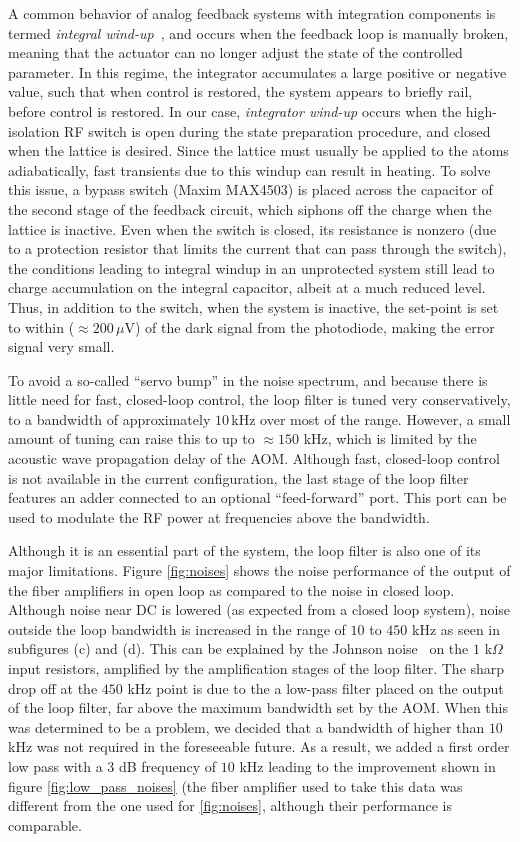 \documentclass[twocolumn,aps,pra,showpacs,preprintnumbers,bibnotes]{revtex4-1}
\begin{document}
A common behavior of analog feedback systems with integration components is termed \textit{integral wind-up}~\cite{Bechhoefer2005}, and occurs when the feedback loop is manually broken, meaning that the actuator can no longer adjust the state of the controlled parameter. 
In this regime, the integrator accumulates a large positive or negative value, such that when control is restored, the system appears to briefly rail, before control is restored.
In our case, \textit{integrator wind-up} occurs when the high-isolation RF switch is open during the state preparation procedure, and closed when the lattice is desired. 
Since the lattice must usually be applied to the atoms adiabatically, fast transients due to this windup can result in heating.
To solve this issue, a bypass switch (Maxim MAX4503) is placed across the capacitor of the second stage of the feedback circuit, which siphons off the charge when the lattice is inactive.
Even when the switch is closed, its resistance is nonzero (due to a protection resistor that limits the current that can pass through the switch), the conditions leading to integral windup in an unprotected system still lead to charge accumulation on the integral capacitor, albeit at a much reduced level.
Thus, in addition to the switch, when the system is inactive, the set-point is set to within ($\approx 200\,\mu$V) of the dark signal from the photodiode, making the error signal very small.

To avoid a so-called ``servo bump'' in the noise spectrum, and because there is little need for fast, closed-loop control, the loop filter is tuned very conservatively, to a bandwidth of approximately $10\,$kHz over most of the range.
However, a small amount of tuning can raise this to up to $\approx150$ kHz, which is limited by the acoustic wave propagation delay of the AOM.
Although fast, closed-loop control is not available in the current configuration, the last stage of the loop filter features an adder connected to an optional ``feed-forward'' port. 
This port can be used to modulate the RF power at frequencies above the bandwidth.

Although it is an essential part of the system, the loop filter is also one of its major limitations. Figure \ref{fig:noises} shows the noise performance of the output of the fiber amplifiers in open loop as compared to the noise in closed loop. Although noise near DC is lowered (as expected from a closed loop system), noise outside the loop bandwidth is increased in the range of $10$ to $450$ kHz as seen in subfigures (c) and (d).
This can be explained by the Johnson noise~\cite{Horowitz2015} on the $1$ k$\Omega$ input resistors, amplified by the amplification stages of the loop filter.
The sharp drop off at the $450$ kHz point is due to the a low-pass filter placed on the output of the loop filter, far above the maximum bandwidth set by the AOM.
When this was determined to be a problem, we decided that a bandwidth of higher than $10\,$ kHz was not required in the foreseeable future. 
As a result, we added a first order low pass with a $3$ dB frequency of $10$ kHz leading to the improvement shown in figure \ref{fig:low_pass_noises} (the fiber amplifier used to take this data was different from the one used for \ref{fig:noises}, although their performance is comparable.
\end{document}
